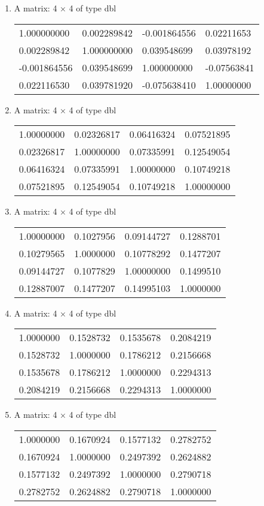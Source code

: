 \documentclass[11pt]{article}
\begin{document}
    
    \begin{enumerate}
\item A matrix: 4 × 4 of type dbl
\begin{tabular}{llll}
	  1.000000000 & 0.002289842 & -0.001864556 &  0.02211653\\
	  0.002289842 & 1.000000000 &  0.039548699 &  0.03978192\\
	 -0.001864556 & 0.039548699 &  1.000000000 & -0.07563841\\
	  0.022116530 & 0.039781920 & -0.075638410 &  1.00000000\\
\end{tabular}

\item A matrix: 4 × 4 of type dbl
\begin{tabular}{llll}
	 1.00000000 & 0.02326817 & 0.06416324 & 0.07521895\\
	 0.02326817 & 1.00000000 & 0.07335991 & 0.12549054\\
	 0.06416324 & 0.07335991 & 1.00000000 & 0.10749218\\
	 0.07521895 & 0.12549054 & 0.10749218 & 1.00000000\\
\end{tabular}

\item A matrix: 4 × 4 of type dbl
\begin{tabular}{llll}
	 1.00000000 & 0.1027956 & 0.09144727 & 0.1288701\\
	 0.10279565 & 1.0000000 & 0.10778292 & 0.1477207\\
	 0.09144727 & 0.1077829 & 1.00000000 & 0.1499510\\
	 0.12887007 & 0.1477207 & 0.14995103 & 1.0000000\\
\end{tabular}

\item A matrix: 4 × 4 of type dbl
\begin{tabular}{llll}
	 1.0000000 & 0.1528732 & 0.1535678 & 0.2084219\\
	 0.1528732 & 1.0000000 & 0.1786212 & 0.2156668\\
	 0.1535678 & 0.1786212 & 1.0000000 & 0.2294313\\
	 0.2084219 & 0.2156668 & 0.2294313 & 1.0000000\\
\end{tabular}

\item A matrix: 4 × 4 of type dbl
\begin{tabular}{llll}
	 1.0000000 & 0.1670924 & 0.1577132 & 0.2782752\\
	 0.1670924 & 1.0000000 & 0.2497392 & 0.2624882\\
	 0.1577132 & 0.2497392 & 1.0000000 & 0.2790718\\
	 0.2782752 & 0.2624882 & 0.2790718 & 1.0000000\\
\end{tabular}


\end{enumerate}
\end{document}
